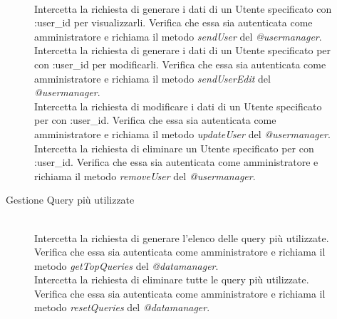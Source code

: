 \begin{description}
\begin{description}
\begin{mldescription}
	 \hfill \\
	Intercetta la richiesta di generare i dati di un Utente specificato con :user\_id per visualizzarli. Verifica che essa sia autenticata come amministratore e richiama il metodo \textit{sendUser} del \textit{@usermanager}.
     \hfill \\
    Intercetta la richiesta di generare i dati di un Utente specificato per con :user\_id per modificarli. Verifica che essa sia autenticata come amministratore e richiama il metodo \textit{sendUserEdit} del \textit{@usermanager}.
     \hfill \\
    Intercetta la richiesta di modificare i dati di un Utente specificato per con :user\_id. Verifica che essa sia autenticata come amministratore e richiama il metodo \textit{updateUser} del \textit{@usermanager}.
     \hfill \\
    Intercetta la richiesta di eliminare un Utente specificato per con :user\_id. Verifica che essa sia autenticata come amministratore e richiama il metodo \textit{removeUser} del \textit{@usermanager}.
  \end{mldescription}    
 \item[Gestione Query più utilizzate]
 \begin{mldescription}
     \hfill \\
    Intercetta la richiesta di generare l'elenco delle query più utilizzate. Verifica che essa sia autenticata come amministratore e richiama il metodo \textit{getTopQueries} del \textit{@datamanager}.
     \hfill \\
    Intercetta la richiesta di eliminare tutte le query più utilizzate. Verifica che essa sia autenticata come amministratore e richiama il metodo \textit{resetQueries} del \textit{@datamanager}.

\end{mldescription}
\end{description}
\end{description}

